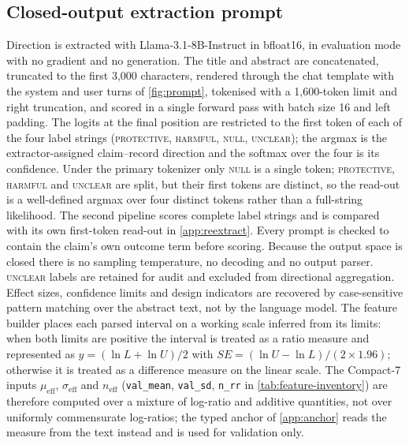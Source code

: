 \documentclass[11pt]{article}
\newcommand{\compact}{Compact-7\xspace}
\begin{document}
\subsection{Closed-output extraction prompt}
Direction is extracted with Llama-3.1-8B-Instruct in bfloat16, in evaluation mode with no gradient
and no generation. The title and abstract are concatenated, truncated to the first 3{,}000
characters, rendered through the chat template with the system and user turns of
\cref{fig:prompt}, tokenised with a 1{,}600-token limit and right truncation, and scored in a
single forward pass with batch size 16 and left padding. The logits at the final position are
restricted to the first token of each of the four label strings (\textsc{protective},
\textsc{harmful}, \textsc{null}, \textsc{unclear}); the argmax is the extractor-assigned claim–record direction and the softmax over the four is its confidence. Under the primary tokenizer only \textsc{null} is a single token; \textsc{protective}, \textsc{harmful} and \textsc{unclear} are split, but their first tokens are distinct, so the read-out is a well-defined argmax over four distinct tokens rather than a full-string likelihood. The second pipeline scores complete label strings and is compared with its own first-token read-out in \cref{app:reextract}. Every prompt is checked to contain the
claim's own outcome term before scoring. Because the output space is closed there is no sampling
temperature, no decoding and no output parser. \textsc{unclear} labels are retained for audit and
excluded from directional aggregation. Effect sizes, confidence limits and design indicators are
recovered by case-sensitive pattern matching over the abstract text, not by the language model.
The feature builder places each parsed interval on a working scale inferred from its limits:
when both limits are positive the interval is treated as a ratio measure and represented as
$y=(\ln L+\ln U)/2$ with $SE=(\ln U-\ln L)/(2\times1.96)$; otherwise it is treated as a
difference measure on the linear scale. The \compact inputs $\mu_{\text{eff}}$,
$\sigma_{\text{eff}}$ and $n_{\text{eff}}$ (\texttt{val\_mean}, \texttt{val\_sd}, \texttt{n\_rr} in
\cref{tab:feature-inventory}) are therefore computed over a mixture of log-ratio and additive
quantities, not over uniformly commensurate log-ratios; the typed anchor of
\cref{app:anchor} reads the measure from the text instead and is used for validation only.
\end{document}
